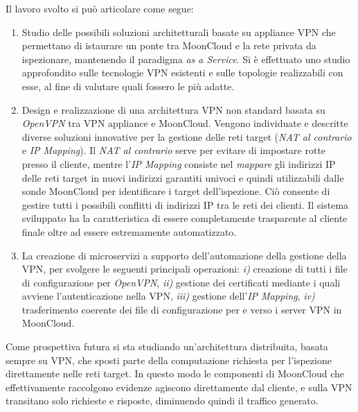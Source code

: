 \documentclass[10pt,a4paper]{article}
\begin{document}
        
        Il lavoro svolto si può articolare come segue:
        \begin{enumerate}
            \item Studio delle possibili soluzioni architetturali basate su appliance VPN che permettano di istaurare
            un ponte tra MoonCloud e la rete privata da ispezionare, mantenendo il paradigma \textit{as a Service}.
            Si è effettuato uno studio approfondito sulle tecnologie VPN esistenti e sulle topologie realizzabili
            con esse, al fine di valutare quali fossero le più adatte.
            \item Design e realizzazione di una architettura VPN non standard basata su \textit{OpenVPN} tra
            VPN appliance e MoonCloud. 
            Vengono individuate e descritte diverse soluzioni innovative per la gestione delle reti target %
            (\textit{NAT al contrario} e \textit{IP Mapping}). Il
            \textit{NAT al contrario} serve per evitare di impostare rotte presso il cliente, mentre
            l'\textit{IP Mapping} consiste nel
            \textit{mappare} gli indirizzi IP delle reti target in nuovi
            indirizzi garantiti univoci e quindi utilizzabili dalle sonde MoonCloud per
            identificare i target dell'ispezione. Ciò consente di gestire tutti i possibili
            conflitti di indirizzi IP tra le reti
            dei clienti. Il sistema sviluppato ha la caratteristica di essere completamente trasparente
            al cliente finale oltre ad essere estremamente automatizzato.
            \item La creazione di microservizi a supporto dell'automazione
            della gestione della VPN, per svolgere le seguenti principali operazioni:
            \textit{i)} creazione di tutti i file di configurazione per \textit{OpenVPN},
            \textit{ii)} gestione dei certificati mediante i quali avviene l'autenticazione
            nella VPN,
            \textit{iii)} gestione dell'\textit{IP Mapping},
            \textit{iv)} trasferimento coerente dei file di configurazione per e verso i server VPN in MoonCloud. %
        \end{enumerate}


        Come prospettiva futura si sta studiando un'architettura distribuita, basata sempre
        su VPN, che sposti parte della computazione richiesta per l'ispezione direttamente nelle reti target. In questo
        modo le componenti di MoonCloud che effettivamente raccolgono evidenze agiscono direttamente
        dal cliente, e sulla VPN transitano solo richieste e risposte, diminuendo quindi
        il traffico generato.

    
\end{document}
